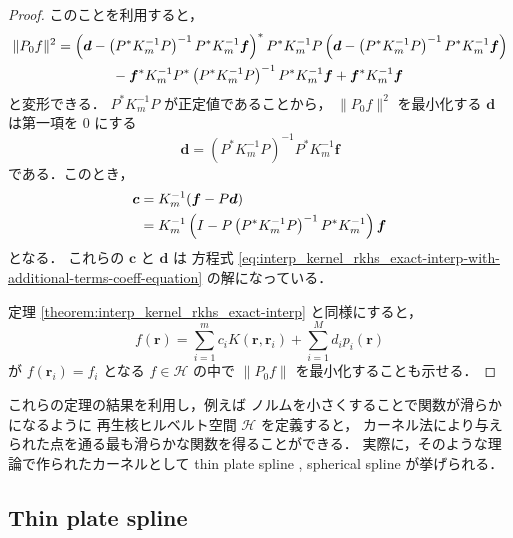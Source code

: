 \begin{proof}
    このことを利用すると，
    \begin{align}
        \|P_0 f\|^2 & =
        \left( \bm{d} - \left( P^* K_m^{-1} P \right)^{-1} P^* K_m^{-1} \bm{f} \right)^* P^* K_m^{-1} P
        \left( \bm{d} - \left( P^* K_m^{-1} P \right)^{-1} P^* K_m^{-1} \bm{f} \right)
        \notag          \\ & \hspace{4em}
        - \bm{f}^* K_m^{-1} P^* \left( P^* K_m^{-1} P \right)^{-1} P^* K_m^{-1} \bm{f}
        + \bm{f}^* K_m^{-1} \bm{f}
    \end{align}
    と変形できる．
    $P^* K_m^{-1} P$ が正定値であることから，
    $\|P_0 f\|^2$ を最小化する $\bm{d}$ は第一項を 0 にする
    \begin{equation}
        \bm{d} = \left( P^* K_m^{-1} P \right)^{-1} P^* K_m^{-1} \bm{f}
    \end{equation}
    である．このとき，
    \begin{align}
        \bm{c}
         & = K_m^{-1} (\bm{f} - P \bm{d})
        \notag                                                                                    \\
         & = K_m^{-1} \left( I - P \left( P^* K_m^{-1} P \right)^{-1} P^* K_m^{-1} \right) \bm{f}
    \end{align}
    となる．
    これらの $\bm{c}$ と $\bm{d}$ は
    方程式 \eqref{eq:interp_kernel_rkhs_exact-interp-with-additional-terms-coeff-equation}
    の解になっている．

    定理 \ref{theorem:interp_kernel_rkhs_exact-interp} と同様にすると，
    \begin{equation}
        f(\bm{r}) = \sum_{i = 1}^{m} c_i K(\bm{r}, \bm{r}_i) + \sum_{i=1}^M d_i p_i(\bm{r})
    \end{equation}
    が $f(\bm{r}_i) = f_i$ となる $f \in \mathcal{H}$ の中で $\|P_0 f\|$ を最小化することも示せる．
\end{proof}

これらの定理の結果を利用し，例えば
ノルムを小さくすることで関数が滑らかになるように
再生核ヒルベルト空間 $\mathcal{H}$ を定義すると，
カーネル法により与えられた点を通る最も滑らかな関数を得ることができる．
実際に，そのような理論で作られたカーネルとして
thin plate spline \cite{Ghosh2010},
spherical spline \cite{Wahba1981}
が挙げられる．

\subsection{Thin plate spline}\label{sec:interp_kernel_thin-plate-spline}

